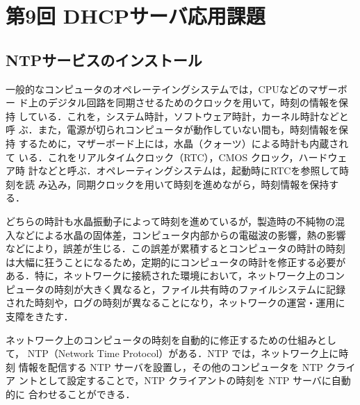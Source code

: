 \section{第9回 DHCPサーバ応用課題}

\subsection{NTPサービスのインストール}

一般的なコンピュータのオペレーテイングシステムでは，CPUなどのマザーボー
ド上のデジタル回路を同期させるためのクロックを用いて，時刻の情報を保持
している．これを，システム時計，ソフトウェア時計，カーネル時計などと呼
ぶ．また，電源が切られコンピュータが動作していない間も，時刻情報を保持
するために，マザーボード上には，水晶（クォーツ）による時計も内蔵されて
いる．これをリアルタイムクロック（RTC），CMOS クロック，ハードウェア時
計などと呼ぶ．オペレーティングシステムは，起動時にRTCを参照して時刻を読
み込み，同期クロックを用いて時刻を進めながら，時刻情報を保持する．

どちらの時計も水晶振動子によって時刻を進めているが，製造時の不純物の混
入などによる水晶の固体差，コンピュータ内部からの電磁波の影響，熱の影響
などにより，誤差が生じる．この誤差が累積するとコンピュータの時計の時刻
は大幅に狂うことになるため，定期的にコンピュータの時計を修正する必要が
ある．特に，ネットワークに接続された環境において，ネットワーク上のコン
ピュータの時刻が大きく異なると，ファイル共有時のファイルシステムに記録
された時刻や，ログの時刻が異なることになり，ネットワークの運営・運用に
支障をきたす．

ネットワーク上のコンピュータの時刻を自動的に修正するための仕組みとし
て， NTP（Network Time Protocol）がある．NTP では，ネットワーク上に時刻
情報を配信する NTP サーバを設置し，その他のコンピュータを NTP クライア
ントとして設定することで，NTP クライアントの時刻を NTP サーバに自動的に
合わせることができる．

